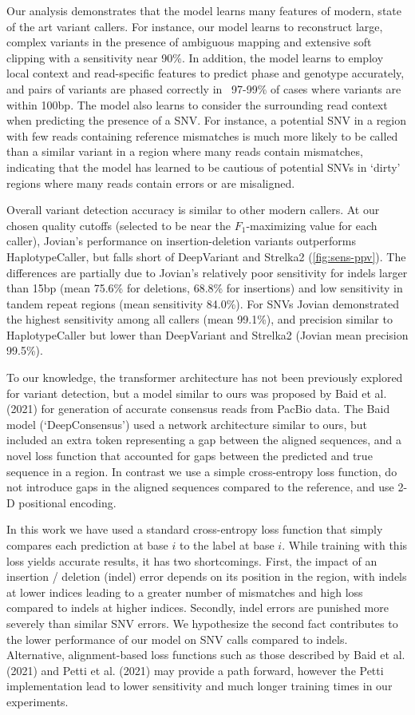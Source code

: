 \documentclass[]{article}
\begin{document}
Our analysis demonstrates that the model learns many features of modern, state of the art variant callers. For instance, our model learns to reconstruct large, complex variants in the presence of ambiguous mapping and extensive soft clipping with a sensitivity near 90\%. In addition, the model learns to employ local context and read-specific features to predict phase and genotype accurately, and pairs of variants are phased correctly in ~97-99\% of cases where variants are within 100bp.  The model also learns to consider the surrounding read context when predicting the presence of a SNV. For instance, a potential SNV in a region with few reads containing reference mismatches is much more likely to be called than a similar variant in a region where many reads contain mismatches, indicating that the model has learned to be cautious of potential SNVs in `dirty' regions where many reads contain errors or are misaligned. 

Overall variant detection accuracy is similar to other modern callers. At our chosen quality cutoffs (selected to be near the $F_1$-maximizing value for each caller), Jovian's performance on insertion-deletion variants outperforms HaplotypeCaller, but falls short of DeepVariant and Strelka2 (\ref{fig:sens-ppv}). The differences are partially due to Jovian's relatively poor sensitivity for indels larger than 15bp (mean 75.6\% for deletions, 68.8\% for insertions) and low sensitivity in tandem repeat regions (mean sensitivity 84.0\%).  For SNVs Jovian demonstrated the highest sensitivity among all callers (mean 99.1\%), and precision similar to HaplotypeCaller but lower than DeepVariant and Strelka2 (Jovian mean precision 99.5\%). 

To our knowledge, the transformer architecture has not been previously explored for variant detection, but a model similar to ours was proposed by Baid et al. (2021) for generation of accurate consensus reads from PacBio data. The Baid model (`DeepConsensus') used a network architecture similar to ours, but included an extra token representing a gap between the aligned sequences, and a novel loss function that accounted for gaps between the predicted and true sequence in a region. In contrast we use a simple cross-entropy loss function, do not introduce gaps in the aligned sequences compared to the reference, and use 2-D positional encoding.  

In this work we have used a standard cross-entropy loss function that simply compares each prediction at base $i$ to the label at base $i$. While training with this loss yields accurate results, it has two shortcomings. First, the impact of an insertion / deletion (indel) error depends on its position in the region, with indels at lower indices leading to a greater number of mismatches and high loss compared to indels at higher indices. Secondly, indel errors are punished more severely than similar SNV errors. We hypothesize the second fact contributes to the lower performance of our model on SNV calls compared to indels. Alternative, alignment-based loss functions such as those described by Baid et al. (2021) and Petti et al. (2021) may provide a path forward, however the Petti implementation lead to lower sensitivity and much longer training times in our experiments. 
\end{document}
